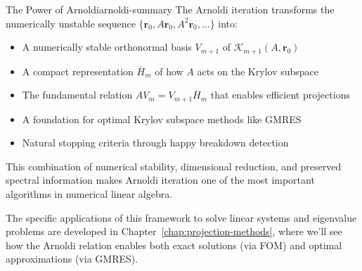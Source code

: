 \begin{summary}{The Power of Arnoldi}{arnoldi-summary}
  The Arnoldi iteration transforms the numerically unstable sequence $\{\mathbf{r}_0, A\mathbf{r}_0, A^2\mathbf{r}_0, \ldots\}$ into:
  \begin{itemize}
    \item A numerically stable orthonormal basis $V_{m+1}$ of $\mathcal{K}_{m+1}(A,\mathbf{r}_0)$
    \item A compact representation $\overline{H}_m$ of how $A$ acts on the Krylov subspace
    \item The fundamental relation $AV_m = V_{m+1}\overline{H}_m$ that enables efficient projections
    \item A foundation for optimal Krylov subspace methods like GMRES
    \item Natural stopping criteria through happy breakdown detection
  \end{itemize}
  This combination of numerical stability, dimensional reduction, and preserved spectral information makes Arnoldi iteration one of the most important algorithms in numerical linear algebra.
\end{summary}

The specific applications of this framework to solve linear systems and eigenvalue problems are developed in Chapter~\ref{chap:projection-methods}, where we'll see how the Arnoldi relation enables both exact solutions (via FOM) and optimal approximations (via GMRES).
